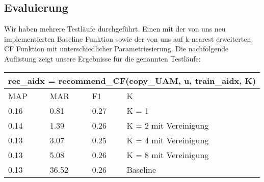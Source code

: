 \documentclass[prodmode,acmtecs]{acmsmall} %
\begin{document}
\subsection{Evaluierung}
Wir haben mehrere Testläufe durchgeführt. Einen mit der von uns neu implementierten Baseline Funktion sowie der von uns auf k-nearest erweiterten CF Funktion mit unterschiedlicher Parametriesierung. Die nachfolgende Auflistung zeigt unsere Ergebnisse für die genannten Testläufe:

\begin{center}
	\resizebox{!}{1.5cm} {
    \begin{tabular}{ | l | l | l | l |}
    \hline
    \multicolumn{4}{|c|}{rec\_aidx = recommend\_CF(copy\_UAM, u, train\_aidx, K)} \\ \hline
    MAP & MAR & F1 & K \\ \hline
    0.16 & 0.81 & 0.27 & K = 1 \\ \hline
    0.14 & 1.39 & 0.26 & K = 2 mit Vereinigung \\ \hline
    0.13 & 3.07 & 0.25 & K = 4 mit Vereinigung \\ \hline
    0.13 & 5.08 & 0.26 & K = 8 mit Vereinigung \\ \hline
    0.13 & 36.52 & 0.26 & Baseline \\ 
    \hline
    \end{tabular}
    }
\end{center}








\medskip
\end{document}
